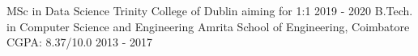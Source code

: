 \begin{cventries}
  \cventry
    {MSc in Data Science}
    {Trinity College of Dublin}
    {aiming for 1:1}
    {2019 - 2020}
    {\empty}
  \cventry
    {B.Tech. in Computer Science and Engineering}
    {Amrita School of Engineering, Coimbatore}
    {CGPA: 8.37/10.0}
    {2013 - 2017}
    {\empty}
\end{cventries}
